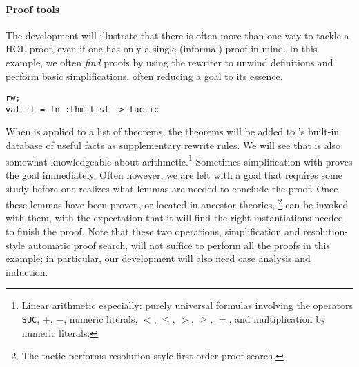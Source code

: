 \paragraph{Proof tools}
The development will illustrate that there is often more than one way to
tackle a HOL proof, even if one has only a single (informal) proof in
mind.
In this example, we often \emph{find} proofs by using the rewriter  to unwind definitions and perform basic simplifications, often reducing a goal to its essence.
\begin{session}
\begin{verbatim}
rw;
val it = fn :thm list -> tactic
\end{verbatim}
\end{session}
When  is applied to a list of theorems, the theorems will be added to \HOL{}'s built-in database of useful facts as supplementary rewrite rules.
We will see that  is also somewhat knowledgeable about
arithmetic.\footnote{Linear arithmetic especially: purely universal
formulas involving the operators {\tt SUC}, $+$, $-$, numeric
literals, $<$, $\leq$, $>$, $\geq$, $=$, and multiplication by numeric
literals.}
Sometimes simplification with  proves the goal immediately.
Often however, we are left with a goal that requires some study before one
realizes what lemmas are needed to conclude the proof.
Once these lemmas have been proven, or located in ancestor theories,
%
\footnote{The  tactic performs resolution-style first-order proof search.}
can be invoked with them, with the expectation that it will find the right instantiations needed to finish the proof.
Note that these two operations, simplification and resolution-style
automatic proof search, will not suffice to perform all the proofs in
this example; in particular, our development will also need case
analysis and induction.

